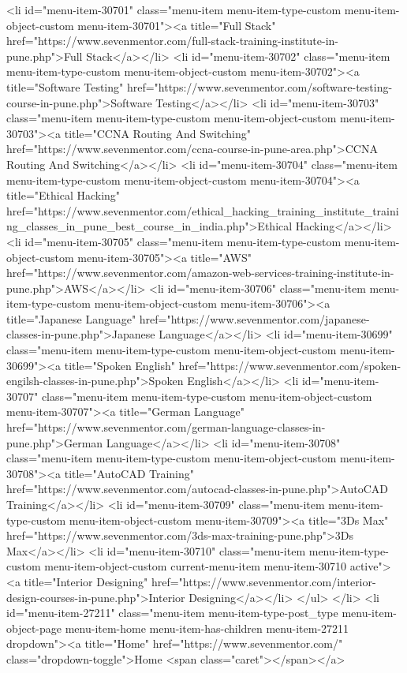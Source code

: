{<li id="menu-item-30701" class="menu-item menu-item-type-custom menu-item-object-custom menu-item-30701"><a title="Full Stack" href="https://www.sevenmentor.com/full-stack-training-institute-in-pune.php">Full Stack</a></li>
<li id="menu-item-30702" class="menu-item menu-item-type-custom menu-item-object-custom menu-item-30702"><a title="Software Testing" href="https://www.sevenmentor.com/software-testing-course-in-pune.php">Software Testing</a></li>
<li id="menu-item-30703" class="menu-item menu-item-type-custom menu-item-object-custom menu-item-30703"><a title="CCNA Routing And Switching" href="https://www.sevenmentor.com/ccna-course-in-pune-area.php">CCNA Routing And Switching</a></li>
<li id="menu-item-30704" class="menu-item menu-item-type-custom menu-item-object-custom menu-item-30704"><a title="Ethical Hacking" href="https://www.sevenmentor.com/ethical_hacking_training_institute_training_classes_in_pune_best_course_in_india.php">Ethical Hacking</a></li>
<li id="menu-item-30705" class="menu-item menu-item-type-custom menu-item-object-custom menu-item-30705"><a title="AWS" href="https://www.sevenmentor.com/amazon-web-services-training-institute-in-pune.php">AWS</a></li>
<li id="menu-item-30706" class="menu-item menu-item-type-custom menu-item-object-custom menu-item-30706"><a title="Japanese Language" href="https://www.sevenmentor.com/japanese-classes-in-pune.php">Japanese Language</a></li>
<li id="menu-item-30699" class="menu-item menu-item-type-custom menu-item-object-custom menu-item-30699"><a title="Spoken English" href="https://www.sevenmentor.com/spoken-engilsh-classes-in-pune.php">Spoken English</a></li>
<li id="menu-item-30707" class="menu-item menu-item-type-custom menu-item-object-custom menu-item-30707"><a title="German Language" href="https://www.sevenmentor.com/german-language-classes-in-pune.php">German Language</a></li>
<li id="menu-item-30708" class="menu-item menu-item-type-custom menu-item-object-custom menu-item-30708"><a title="AutoCAD Training" href="https://www.sevenmentor.com/autocad-classes-in-pune.php">AutoCAD Training</a></li>
<li id="menu-item-30709" class="menu-item menu-item-type-custom menu-item-object-custom menu-item-30709"><a title="3Ds Max" href="https://www.sevenmentor.com/3ds-max-training-pune.php">3Ds Max</a></li>
<li id="menu-item-30710" class="menu-item menu-item-type-custom menu-item-object-custom current-menu-item menu-item-30710 active"><a title="Interior Designing" href="https://www.sevenmentor.com/interior-design-courses-in-pune.php">Interior Designing</a></li>
</ul>
</li>
<li id="menu-item-27211" class="menu-item menu-item-type-post_type menu-item-object-page menu-item-home menu-item-has-children menu-item-27211 dropdown"><a title="Home" href="https://www.sevenmentor.com/" class="dropdown-toggle">Home <span class="caret"></span></a>
}

